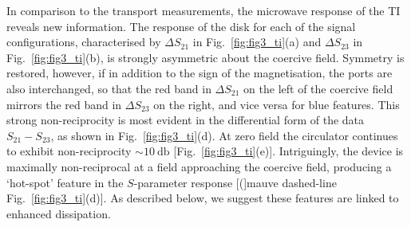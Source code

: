 In comparison to the transport measurements, the microwave response of the TI reveals new information. The response of the disk for each of the signal configurations, characterised by $\Delta S_{21}$ in Fig.~\ref{fig:fig3_ti}(a) and $\Delta S_{23}$ in Fig.~\ref{fig:fig3_ti}(b), is strongly asymmetric about the coercive field. Symmetry is restored, however, if in addition to the sign of the magnetisation, the ports are also interchanged, so that the red band in $\Delta S_{21}$ on the left of the coercive field mirrors the red band in $\Delta S_{23}$ on the right, and vice versa for blue features. This strong non-reciprocity is most evident in the differential form of the data $S_{21} -  S_{23}$, as shown in Fig.~\ref{fig:fig3_ti}(d). At zero field the circulator continues to exhibit non-reciprocity $\sim \SI{10}{\decibel}$ [Fig.~\ref{fig:fig3_ti}(e)]. Intriguingly, the device is maximally non-reciprocal at a field approaching the coercive field, producing a `hot-spot' feature in the $S$-parameter response [(]mauve dashed-line Fig.~\ref{fig:fig3_ti}(d)]. As described below, we suggest these features are linked to enhanced dissipation.

